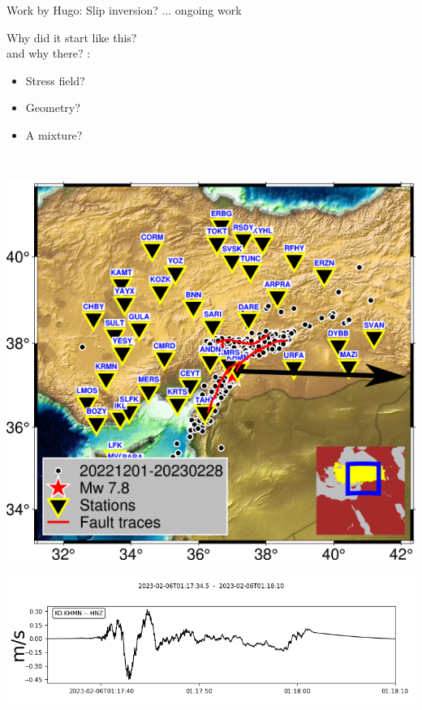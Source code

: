 \documentclass{beamer}
\begin{document}
\begin{frame}
 {Work by Hugo: Slip inversion? ... ongoing work}
 
 \vskip -0.5cm \begin{minipage}{0.51\linewidth}
  \hskip -0.8cm
\end{minipage} 
\begin{minipage}{0.47\linewidth}
\vskip 0.7cm Why did it start like this? \\ and why there? :
\vskip 0.1cm
\begin{itemize}
 \item Stress field?
 \item Geometry?
 \item A mixture?
\end{itemize}
\end{minipage} \\ \vskip 0.2cm \pause
\begin{minipage}{0.45\linewidth}
 \includegraphics[width=1\linewidth]{images/Map2.png}
\end{minipage}
\begin{minipage}{0.45\linewidth}
 \includegraphics[width=1.4\linewidth]{images/p1.png}
\end{minipage}
 
\end{frame}
\end{document}
